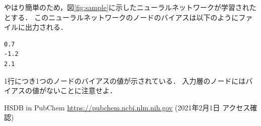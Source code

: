 \documentclass[11pt, titlepage, dvipdfmx, twoside]{jarticle}
\newcommand{\figref}[1]{図\ref{fig:#1}}
\begin{document}
やはり簡単のため，\figref{sample}に示したニューラルネットワークが学習されたとする．
このニューラルネットワークのノードのバイアスは以下のようにファイルに出力される．

\begin{oframed}
{\small
\begin{verbatim}
0.7
-1.2
2.1
\end{verbatim}
}
\end{oframed}
1行につき1つのノードのバイアスの値が示されている．
入力層のノードにはバイアスの値がないことに注意せよ．


\begin{thebibliography}{9}
 HSDB in PubChem \url{https://pubchem.ncbi.nlm.nih.gov} (2021年2月1日 アクセス確認)
\end{thebibliography}
\end{document}
